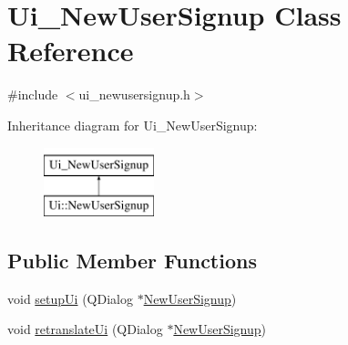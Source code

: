 \hypertarget{classUi__NewUserSignup}{\section{Ui\-\_\-\-New\-User\-Signup Class Reference}
\label{classUi__NewUserSignup}
}


{\ttfamily \#include $<$ui\-\_\-newusersignup.\-h$>$}

Inheritance diagram for Ui\-\_\-\-New\-User\-Signup\-:\begin{figure}[H]
\begin{center}
\leavevmode
\includegraphics[height=2.000000cm]{classUi__NewUserSignup}
\end{center}
\end{figure}
\subsection*{Public Member Functions}
\begin{DoxyCompactItemize}
\item 
void \hyperlink{classUi__NewUserSignup_a7deffd7501fcd2444a92a97a80c55b10}{setup\-Ui} (Q\-Dialog $\ast$\hyperlink{classNewUserSignup}{New\-User\-Signup})
\item 
void \hyperlink{classUi__NewUserSignup_a9e113456ea9565e7c38d9508ffd314e4}{retranslate\-Ui} (Q\-Dialog $\ast$\hyperlink{classNewUserSignup}{New\-User\-Signup})
\end{DoxyCompactItemize}
